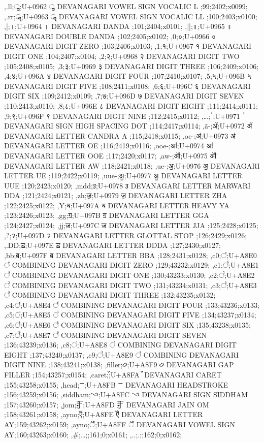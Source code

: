 \documentclass{article}
\begin{document}
{,.ll;ॢ;U+0962 ॢ DEVANAGARI VOWEL SIGN VOCALIC L ;99;2402;x0099;
,.rr;ॣ;U+0963 ॣ DEVANAGARI VOWEL SIGN VOCALIC LL ;100;2403;x0100;
,|;।;U+0964 । DEVANAGARI DANDA ;101;2404;x0101;
,||;॥;U+0965 ॥ DEVANAGARI DOUBLE DANDA ;102;2405;x0102;
,0;०;U+0966 ० DEVANAGARI DIGIT ZERO ;103;2406;x0103;
,1;१;U+0967 १ DEVANAGARI DIGIT ONE ;104;2407;x0104;
,2;२;U+0968 २ DEVANAGARI DIGIT TWO ;105;2408;x0105;
,3;३;U+0969 ३ DEVANAGARI DIGIT THREE ;106;2409;x0106;
,4;४;U+096A ४ DEVANAGARI DIGIT FOUR ;107;2410;x0107;
,5;५;U+096B ५ DEVANAGARI DIGIT FIVE ;108;2411;x0108;
,6;६;U+096C ६ DEVANAGARI DIGIT SIX ;109;2412;x0109;
,7;७;U+096D ७ DEVANAGARI DIGIT SEVEN ;110;2413;x0110;
,8;८;U+096E ८ DEVANAGARI DIGIT EIGHT ;111;2414;x0111;
,9;९;U+096F ९ DEVANAGARI DIGIT NINE ;112;2415;x0112;
%  
,…;ॱ;U+0971 ॱ DEVANAGARI SIGN HIGH SPACING DOT ;114;2417;x0114;
,\~a-;ॲ;U+0972 ॲ DEVANAGARI LETTER CANDRA A ;115;2418;x0115;
,oe-;ॳ;U+0973 ॳ DEVANAGARI LETTER OE ;116;2419;x0116;
,ooe-;ॴ;U+0974 ॴ DEVANAGARI LETTER OOE ;117;2420;x0117;
,aw-;ॵ;U+0975 ॵ DEVANAGARI LETTER AW ;118;2421;x0118;
,ue-;ॶ;U+0976 ॶ DEVANAGARI LETTER UE ;119;2422;x0119;
,uue-;ॷ;U+0977 ॷ DEVANAGARI LETTER UUE ;120;2423;x0120;
,mdd;ॸ;U+0978 ॸ DEVANAGARI LETTER MARWARI DDA ;121;2424;x0121;
,zh;ॹ;U+0979 ॹ DEVANAGARI LETTER ZHA ;122;2425;x0122;
,Y;ॺ;U+097A ॺ DEVANAGARI LETTER HEAVY YA ;123;2426;x0123;
,gg;ॻ;U+097B ॻ DEVANAGARI LETTER GGA ;124;2427;x0124;
,jj;ॼ;U+097C ॼ DEVANAGARI LETTER JJA ;125;2428;x0125;
,?;ॽ;U+097D ॽ DEVANAGARI LETTER GLOTTAL STOP ;126;2429;x0126;
,.DD;ॾ;U+097E ॾ DEVANAGARI LETTER DDDA ;127;2430;x0127;
,bb;ॿ;U+097F ॿ DEVANAGARI LETTER BBA ;128;2431;x0128;
,c0;꣠;U+A8E0 ꣠ COMBINING DEVANAGARI DIGIT ZERO ;129;43232;x0129;
,c1;꣡;U+A8E1 ꣡ COMBINING DEVANAGARI DIGIT ONE ;130;43233;x0130;
,c2;꣢;U+A8E2 ꣢ COMBINING DEVANAGARI DIGIT TWO ;131;43234;x0131;
,c3;꣣;U+A8E3 ꣣ COMBINING DEVANAGARI DIGIT THREE ;132;43235;x0132;
,c4;꣤;U+A8E4 ꣤ COMBINING DEVANAGARI DIGIT FOUR ;133;43236;x0133;
,c5;꣥;U+A8E5 ꣥ COMBINING DEVANAGARI DIGIT FIVE ;134;43237;x0134;
,c6;꣦;U+A8E6 ꣦ COMBINING DEVANAGARI DIGIT SIX ;135;43238;x0135;
,c7;꣧;U+A8E7 ꣧ COMBINING DEVANAGARI DIGIT SEVEN ;136;43239;x0136;
,c8;꣨;U+A8E8 ꣨ COMBINING DEVANAGARI DIGIT EIGHT ;137;43240;x0137;
,c9;꣩;U+A8E9 ꣩ COMBINING DEVANAGARI DIGIT NINE ;138;43241;x0138;
%  
%  
%  
%  
%  
%  
%  
%  
%  
%  
%  
%  
%  
%  
%  
,filler;꣹;U+A8F9 ꣹ DEVANAGARI GAP FILLER ;154;43257;x0154;
,caret;꣺;U+A8FA ꣺ DEVANAGARI CARET ;155;43258;x0155;
,head;ꣻ;U+A8FB ꣻ DEVANAGARI HEADSTROKE ;156;43259;x0156;
,siddham;꣼;U+A8FC ꣼ DEVANAGARI SIGN SIDDHAM ;157;43260;x0157;
,jom;ꣽ;U+A8FD ꣽ DEVANAGARI JAIN OM ;158;43261;x0158;
,ayno;ꣾ;U+A8FE ꣾ DEVANAGARI LETTER AY;159;43262;x0159;
,ayno;ꣿ;U+A8FF ꣿ DEVANAGARI VOWEL SIGN AY;160;43263;x0160;
,\#;…;;161;0;x0161;
,..;.;;162;0;x0162;
}
\end{document}
